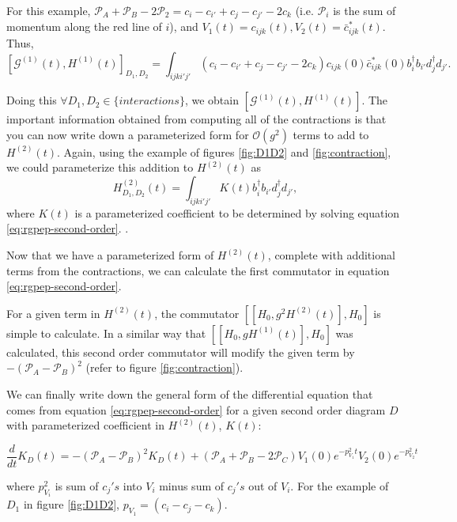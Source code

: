 For this example, $\mathcal{P}_A + \mathcal{P}_B - 2\mathcal{P}_2 = c_i - c_{i'} + c_j - c_{j'} - 2c_k$ (i.e. $\mathcal{P}_i$ is the sum of momentum along the red line of $i$), and $V_1(t) = c_{ijk}(t), V_2(t) = \bar c^*_{ijk}(t)$. Thus, $$\left[\mathcal{G}^{(1)}(t), H^{(1)}(t) \right]_{D_1, D_2} = \int_{ijki'j'}\left(c_i - c_{i'} + c_j - c_{j'} - 2c_k \right)c_{ijk}(0)\bar c^*_{ijk}(0) b_i^\dagger b_{i'}d_j^\dagger d_{j'}.$$

Doing this $\forall D_1, D_2 \in \{interactions\}$, we obtain $\left[\mathcal{G}^{(1)}(t), H^{(1)}(t) \right]$. 
The important information obtained from computing all of the contractions is that you can now write down a parameterized form for $\mathcal{O}(g^2)$ terms to add to $H^{(2)}(t)$. 
Again, using the example of figures \ref{fig:D1D2} and \ref{fig:contraction}, we could parameterize this addition to $H^{(2)}(t)$ as $$H^{(2)}_{D_1, D_2}(t) = \int_{ijki'j'}K(t)  b_i^\dagger b_{i'}d_j^\dagger d_{j'},$$ where $K(t)$ is a parameterized coefficient to be determined by solving equation \ref{eq:rgpep-second-order}. .

Now that we have a parameterized form of $H^{(2)}(t)$, complete with additional terms from the contractions, we can calculate the first commutator in equation \ref{eq:rgpep-second-order}.

For a given term in $H^{(2)}(t)$, the commutator $\left[\left[H_0, g^2H^{(2)}(t)\right], H_0\right]$ is simple to calculate. 
In a similar way that $\left[\left[H_0, gH^{(1)}(t)\right], H_0\right]$ was calculated, this second order commutator will modify the given term by $-\left(\mathcal{P}_A - \mathcal{P}_B\right)^2$ (refer to figure \ref{fig:contraction}).

We can finally write down the general form of the differential equation that comes from equation \ref{eq:rgpep-second-order} for a given second order diagram $D$ with parameterized coefficient in $H^{(2)}(t)$, $K(t)$:

\begin{equation}
    \label{eq:second-order-DE}
    \frac{d}{dt}K_D(t) = -\left(\mathcal{P}_A - \mathcal{P}_B \right)^2 K_D(t) + \left(\mathcal{P}_A + \mathcal{P}_B - 2\mathcal{P}_C \right)V_1(0)e^{-p_{V_1}^2t}V_2(0)e^{-p_{V_2}^2t}
\end{equation}

where $p_{V_i}^2$ is sum of $c_j's$ into $V_i$ minus sum of $c_j's$ out of $V_i$. 
For the example of $D_1$ in figure \ref{fig:D1D2}, $p_{V_1} = \left(c_i - c_j - c_k \right)$.

